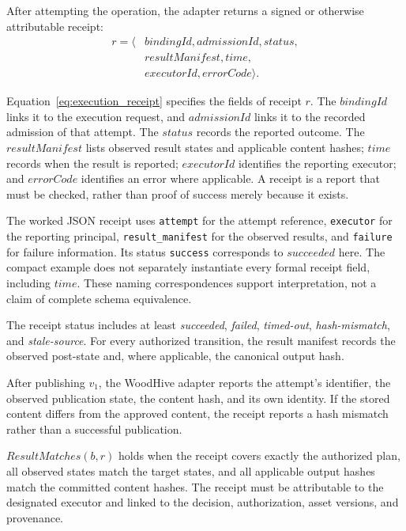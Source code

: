 \documentclass[journal]{IEEEtran}
\begin{document}
After attempting the operation, the adapter returns
a signed or otherwise attributable receipt:
\begin{equation}
\label{eq:execution_receipt}
\begin{aligned}
r=\langle&
bindingId,admissionId,status,\\
&resultManifest,time,\\
&executorId,errorCode\rangle.
\end{aligned}
\end{equation}

Equation~\ref{eq:execution_receipt} specifies the fields of receipt
$r$. The $bindingId$ links it to the execution request, and
$admissionId$ links it to the recorded admission of that attempt.
The $status$ records the reported outcome. The $resultManifest$
lists observed result states and applicable content hashes;
$time$ records when the result is reported; $executorId$ identifies
the reporting executor; and $errorCode$ identifies an error where
applicable.
A receipt is a report that must be checked, rather than proof of
success merely because it exists.

The worked JSON receipt uses \texttt{attempt} for the attempt
reference, \texttt{executor} for the reporting principal,
\texttt{result\_manifest} for the observed results, and
\texttt{failure} for failure information. Its status
\texttt{success} corresponds to $\mathit{succeeded}$ here.
The compact example does not separately instantiate every formal
receipt field, including $time$. These naming correspondences
support interpretation, not a claim of complete schema equivalence.

The receipt status includes at least \emph{succeeded},
\emph{failed}, \emph{timed-out}, \emph{hash-mismatch},
and \emph{stale-source}. For every authorized transition,
the result manifest records the observed post-state and,
where applicable, the canonical output hash.

After publishing $v_1$, the WoodHive adapter reports the attempt's
identifier, the observed publication state, the content hash,
and its own identity. If the stored content differs from the
approved content, the receipt reports a hash mismatch rather
than a successful publication.

$ResultMatches(b,r)$ holds when the receipt covers exactly
the authorized plan, all observed states match the target
states, and all applicable output hashes match the committed
content hashes. The receipt must be attributable to the
designated executor and linked to the decision, authorization,
asset versions, and provenance.
\end{document}
